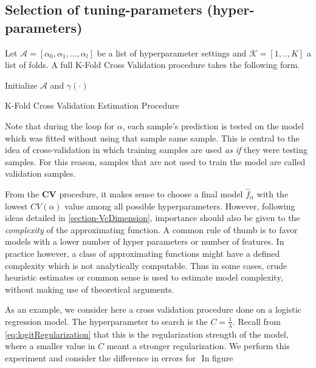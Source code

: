 \subsection{Selection of tuning-parameters (hyper-parameters) }\label{subsection:selection_hyper_params}

 Let $\mathcal{A} = [\alpha_0, \alpha_1,\ldots, \alpha_l  ]$ be a list of hyperparameter settings and $\mathcal{K} =[1,..,K]$ a list of folds. A full K-Fold Cross Validation procedure takes the following form.

 \begin{algorithm}%
 \SetAlgoLined{}
 Initialize $\mathcal{A}$ and $\gamma(\cdot)$\;
 \caption{K-Fold Cross Validation Estimation Procedure}
 \end{algorithm}

Note that during the loop for $\alpha$, each sample's prediction is tested on the model which was fitted without using that sample same sample.
This is central to the idea of cross-validation in which training samples are used \textit{as if} they were testing samples.
For this reason, samples that are not used to train the model are called validation samples.

From the \textbf{CV} procedure, it makes sense to choose a final model $\hat{f}_\alpha$ with the lowest $CV(\alpha)$ value among all possible hyperparameters. However, following ideas detailed in \cref{section-VcDimension}, importance should also be given to the \textit{complexity} of the approximating function. A common rule of thumb is to favor models with a lower number of hyper parameters or number of features. In practice however, a class of approximating functions might have a defined complexity which is not analytically computable. Thus in some cases, crude heuristic estimates or common sense is used to estimate model complexity, without making use of theoretical arguments.


As an example, we consider here a cross validation procedure done on a logistic regression model. The hyperparameter to search is the $C = \frac{1}{\lambda}$. Recall from \cref{eq:logitRegularization} that this is the regularization strength of the model, where a smaller value in $C$ meant a stronger regularization. We perform this experiment and consider the difference in errors for $$
In figure

